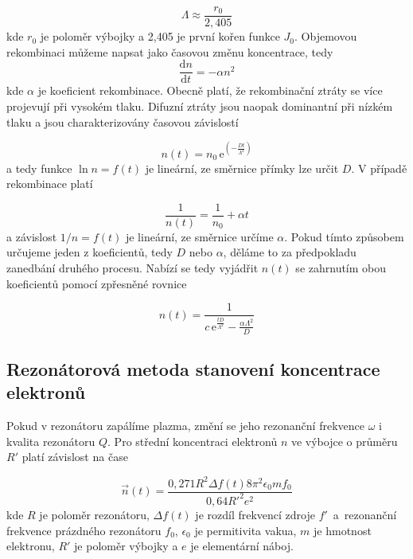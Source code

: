 \documentclass[a4paper,12pt]{article}
\newcommand{\e}{\text{e}}
\begin{document}
\begin{equation}
	\Lambda \approx \frac{r_0}{2,405}
\end{equation}
kde $r_0$ je poloměr výbojky a 2,405 je první kořen funkce $J_0$.
Objemovou rekombinaci můžeme napsat jako časovou změnu koncentrace, tedy
\begin{equation}
	\frac{\text{d}n}{\text{d}t} = -\alpha n^2
\end{equation}
kde $\alpha$ je koeficient rekombinace. Obecně platí, že rekombinační ztráty se více projevují při vysokém tlaku. Difuzní ztráty jsou naopak dominantní při nízkém tlaku a jsou charakterizovány časovou závislostí 

\begin{equation}
	n(t) = n_0\,\e^{\left( -\frac{Dt}{\Lambda^2}\right)}
\end{equation}
a tedy funkce $\ln n = f(t)$ je lineární, ze směrnice přímky lze určit $D$. V 
případě rekombinace platí

\begin{equation}
	\frac{1}{n(t)} = \frac{1}{n_0} + \alpha t
\end{equation} 
a závislost $1/n = f(t)$ je lineární, ze směrnice určíme $\alpha$. Pokud tímto 
způsobem určujeme jeden z koeficientů, tedy $D$ nebo $\alpha$, děláme to za 
předpokladu zanedbání druhého procesu. Nabízí se tedy vyjádřit $n(t)$ se 
zahrnutím obou koeficientů pomocí zpřesněné rovnice

\begin{equation}
	n(t) = \frac{1}{c\,\e^{\frac{tD}{\Lambda^2}}-\frac{\alpha \Lambda^2}{D}}
	\label{zpresnena}
\end{equation}

\subsection{Rezonátorová metoda stanovení koncentrace elektronů}
Pokud v rezonátoru zapálíme plazma, změní se jeho rezonanční frekvence $\omega$ i kvalita rezonátoru $Q$. Pro střední koncentraci elektronů $n$ ve výbojce o průměru $R'$ platí závislost na čase

\begin{equation}
	\overrightarrow{n}(t) = \frac{0,271 R^2 \Delta f(t) 8 \pi^2 \epsilon_0 m f_0}{0,64 R'^2 e^2}
	\label{koncentrace}
\end{equation}
kde $R$ je poloměr rezonátoru, $\Delta f(t)$ je rozdíl frekvencí zdroje $f'$~a~rezonanční frekvence prázdného rezonátoru 
$f_0$, $\epsilon_0$ je permitivita vakua, $m$ je hmotnost elektronu, $R'$ je 
poloměr výbojky a $e$ je elementární náboj.
\end{document}
